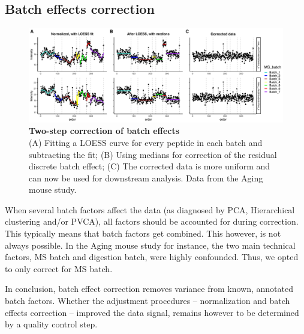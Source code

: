\documentclass[num-refs]{wiley-article}
\begin{document}
\subsection{Batch effects correction}
\begin{figure}[hbt]
	\includegraphics[width=\textwidth]{figures/Fig5_batch_correction1.pdf}
	
	\caption{\textbf{Two-step correction of batch effects}  \\
		\footnotesize
		(A) Fitting a LOESS curve for every peptide in each batch and subtracting the fit; (B) Using medians for correction of the residual discrete batch effect; (C) The corrected data is more uniform and can now be used for downstream analysis. Data from the Aging mouse study.}
	\label{fig:batch_fig5_batchCorrection}
\end{figure}

When several batch factors affect the data (as diagnosed by PCA, Hierarchical clustering and/or PVCA), all factors should be accounted for during correction. This typically means that batch factors get combined. This however, is not always possible. In the Aging mouse study for instance, the two main technical factors, MS batch and digestion batch, were highly confounded. Thus, we opted to only correct for MS batch.

In conclusion, batch effect correction removes variance from known, annotated batch factors. Whether the adjustment procedures – normalization and batch effects correction – improved the data signal, remains however to be determined by a quality control step.
\end{document}
